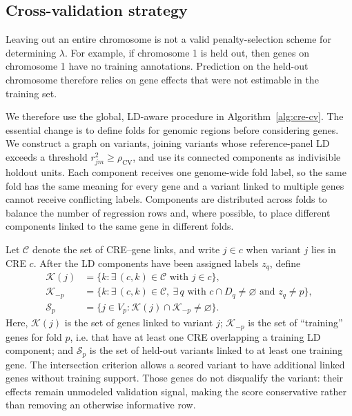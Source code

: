\documentclass[11pt]{article}
\begin{document}
\subsection{Cross-validation strategy}

Leaving out an entire chromosome is not a valid penalty-selection scheme for determining $\lambda$. For example, if chromosome 1 is held out, then genes on chromosome 1 have no training annotations. Prediction on the held-out chromosome therefore relies on gene effects that were not estimable in the training set.

We therefore use the global, LD-aware procedure in Algorithm~\ref{alg:cre-cv}. The essential change is to define folds for genomic regions before considering genes. We construct a graph on variants, joining variants whose reference-panel LD exceeds a threshold $r_{jm}^2\ge\rho_{\mathrm{CV}}$, and use its connected components as indivisible holdout units. Each component receives one genome-wide fold label, so the same fold has the same meaning for every gene and a variant linked to multiple genes cannot receive conflicting labels. Components are distributed across folds to balance the number of regression rows and, where possible, to place different components linked to the same gene in different folds.

Let $\mathcal{C}$ denote the set of CRE--gene links, and write $j\in c$ when variant $j$ lies in CRE $c$. After the LD components have been assigned labels $z_q$, define
\begin{equation}
\begin{aligned}
\mathcal{K}(j)
    &= \{k:\exists\,(c,k)\in\mathcal{C}\text{ with }j\in c\}, \\
\mathcal{K}_{-p}
    &= \{k:\exists\,(c,k)\in\mathcal{C},\ \exists\,q\text{ with }c\cap D_q\ne\varnothing\text{ and }z_q\ne p\}, \\
\mathcal{S}_p
    &= \{j\in V_p:\mathcal{K}(j)\cap\mathcal{K}_{-p}\ne\varnothing\}.
\end{aligned}
\label{eq:cv-sets}
\end{equation}
Here, $\mathcal{K}(j)$ is the set of genes linked to variant $j$; $\mathcal{K}_{-p}$ is the set of ``training'' genes for fold $p$, i.e. that have at least one CRE overlapping a training LD component; and $\mathcal{S}_p$ is the set of held-out variants linked to at least one training gene. The intersection criterion allows a scored variant to have additional linked genes without training support. Those genes do not disqualify the variant: their effects remain unmodeled validation signal, making the score conservative rather than removing an otherwise informative row.
\end{document}
